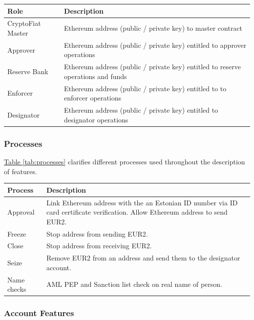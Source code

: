 \documentclass[a4paper,12pt]{article} %
\newcommand{\hypertableref}[1]{\hyperref[#1]{Table \ref{#1}}}
\begin{document}
{{\begin{center}
\begin{tabular}{ | p{3cm} | p{12cm} | }
 \hline
 Role & Description
 \\ \hline\hline
 CryptoFiat Master & Ethereum address (public / private key) to master contract
 \\ \hline
 Approver & Ethereum address (public / private key) entitled to approver operations
 \\ \hline
 Reserve Bank & Ethereum address (public / private key) entitled to reserve operations and funds
 \\ \hline
 Enforcer & Ethereum address (public / private key) entitled to to enforcer operations
 \\ \hline
 Designator & Ethereum address (public / private key) entitled to designator operations
 \\ \hline
\end{tabular}
\end{center}
\label{tab:roles}

\subsubsection{Processes} \label{sssec:3.3:processes}

\hypertableref{tab:processes} clarifies different processes used throughout the description of features.

\begin{center}
\begin{tabular}{ | p{3cm} | p{12cm} | }
 \hline
 Process & Description
 \\ \hline\hline
 Approval & Link Ethereum address with the an Estonian ID number via ID card certificate verification. Allow Ethereum address to send EUR2.
 \\ \hline
 Freeze & Stop address from sending EUR2.
 \\ \hline
 Close & Stop address from receiving EUR2.
 \\ \hline
 Seize & Remove EUR2 from an address and send them to the designator account.
 \\ \hline
 Name checks & AML PEP and Sanction list check on real name of person.
 \\ \hline
\end{tabular}
\end{center}
\label{tab:processes}

\subsubsection{Account Features} \label{sssec:3.3:accounts}

}}
\end{document}
